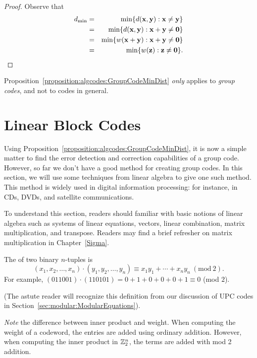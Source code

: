 \begin{proof}
Observe that
\begin{eqnarray*}
d_{\min} &= & \min \{ d({\bold x},{\bold y}) : {\bold x}
\neq
{\bold y} \} \\
&= & \min \{ d({\bold x},{\bold y}) : {\bold x}+{\bold y}
\neq {\bold 0} \} \\
&=& \min\{ w({\bold x} + {\bold y}) : {\bold x}+{\bold y}
\neq {\bold 0} \} \\
& = & \min\{ w({\bold z}) : {\bold z} \neq {\bold 0} \}.
\end{eqnarray*}
\end{proof}
 
 \begin{warn}
 Proposition~\ref{proposition:algcodes:GroupCodeMinDist}  \emph{only} applies to \emph{group codes}, and not to codes in general.
 \end{warn}
 
\section{Linear Block Codes}
\label{sec:ErrorAndCorrectionCode:BlockCodes}
  
Using Proposition~\ref{proposition:algcodes:GroupCodeMinDist}, it is now a simple matter to find the error detection and correction capabilities of a group code. However, so far we don't have a good method  for creating group codes. In this section, we will use some techniques from linear algebra to give one such method. This method is widely used in digital information processing: for instance, in CDs, DVDs, and satellite communications.

To understand this section, readers should familiar with basic notions of linear algebra such as systems of linear equations, vectors, linear combination, matrix multiplication, and transpose. Readers may find a brief refresher on matrix multiplication in Chapter~\ref{Sigma}.
 
 \begin{defn}
The  of two binary
$n$-tuples is
\[
(x_1, x_2, \ldots, x_n) \cdot (y_1, y_2, \ldots, y_n) \equiv x_1 y_1 + \cdots + x_n y_n ~(\mathrm{mod~}2).
\]
For example, $(011001) \cdot (110101) = 0+1+0+0+0+1 \equiv 0$ (mod $2$). 

\noindent
(The astute reader will recognize this definition from our discussion of UPC codes in Section~\ref{sec:modular:ModularEquations}).
\end{defn}
\emph{Note} the difference between inner product and weight. When computing the weight of a codeword, the entries are added using ordinary addition. However, when computing the inner product  in ${\Bbb Z_2^n}$, the terms are added  with mod 2 addition.

